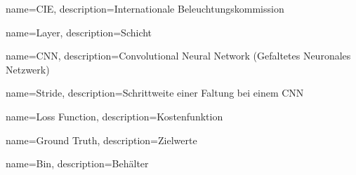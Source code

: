 {
	name=CIE,
	description={Internationale Beleuchtungskommission}
}

{
	name=Layer,
	description={Schicht}
}

{
	name=CNN,
	description={Convolutional Neural Network (Gefaltetes Neuronales Netzwerk)}
}

{
	name=Stride,
	description={Schrittweite einer Faltung bei einem \gls{CNN}}
}

{
	name=Loss Function,
	description={Kostenfunktion}
}

{
	name=Ground Truth,
	description={Zielwerte}
}

{
	name=Bin,
	description={Behälter}
}
